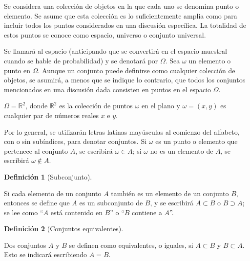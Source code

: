 \documentclass[
  us-letterpaper,
]{scrreprt}
\theoremstyle{plain}
\theoremstyle{definition}
\newtheorem{definition}{Definición}[chapter]
\theoremstyle{definition}
\theoremstyle{plain}
\theoremstyle{remark}
\begin{document}
Se considera una colección de objetos en la que cada uno se denomina
punto o elemento. Se asume que esta colección es lo suficientemente
amplia como para incluir todos los puntos considerados en una discusión
específica. La totalidad de estos puntos se conoce como espacio,
universo o conjunto universal.

Se llamará al espacio (anticipando que se convertirá en el espacio
muestral cuando se hable de probabilidad) y se denotará por \(\Omega\).
Sea \(\omega\) un elemento o punto en \(\Omega\). Aunque un conjunto
puede definirse como cualquier colección de objetos, se asumirá, a menos
que se indique lo contrario, que todos los conjuntos mencionados en una
discusión dada consisten en puntos en el espacio \(\Omega\).

\begin{tcolorbox}[enhanced jigsaw, bottomtitle=1mm, coltitle=black, breakable, leftrule=.75mm, left=2mm, rightrule=.15mm, titlerule=0mm, toprule=.15mm, toptitle=1mm, colback=white, colframe=quarto-callout-caution-color-frame, title={Ejemplo}, colbacktitle=quarto-callout-caution-color!10!white, arc=.35mm, bottomrule=.15mm, opacitybacktitle=0.6, opacityback=0]

\(\Omega = \mathbb{R}^2\), donde \(\mathbb{R}^2\) es la colección de
puntos \(\omega\) en el plano y \(\omega=(x,y)\) es cualquier par de
números reales \(x\) e \(y\).

\end{tcolorbox}

Por lo general, se utilizarán letras latinas mayúsculas al comienzo del
alfabeto, con o sin subíndices, para denotar conjuntos. Si \(\omega\) es
un punto o elemento que pertenece al conjunto \(A\), se escribirá
\(\omega \in A\); si \(\omega\) no es un elemento de \(A\), se escribirá
\(\omega \notin A\).

\begin{definition}[Subconjunto]\protect\hypertarget{def-sub}{}\label{def-sub}

Si cada elemento de un conjunto \(A\) también es un elemento de un
conjunto \(B\), entonces se define que \(A\) es un subconjunto de \(B\),
y se escribirá \(A\subset B\) o \(B\supset A\); se lee como ``\(A\) está
contenido en \(B\)'' o ``\(B\) contiene a \(A\)''.

\end{definition}

\begin{definition}[Conjuntos
equivalentes]\protect\hypertarget{def-ce}{}\label{def-ce}

Dos conjuntos \(A\) y \(B\) se definen como equivalentes, o iguales, si
\(A\subset B\) y \(B\subset A\). Esto se indicará escribiendo \(A=B\).

\end{definition}
\end{document}
